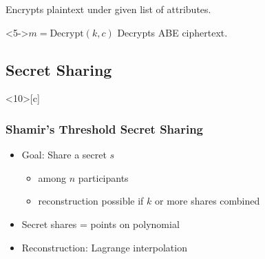 \begin{frame}
\begin{minipage}[t]{0.49\textwidth}
\begin{block}
            \centering
            Encrypts plaintext under given list of attributes.
        \end{block}
        \vspace{0.5cm}
        \begin{block}<5->{\centering $m = \text{Decrypt}(k, c)$}
            \centering
            Decrypts ABE ciphertext.
        \end{block}
    \end{minipage}
\end{frame}

\subsection{Secret Sharing}
\begin{frame}<10>[c]
    \frametitle{Shamir's Threshold Secret Sharing}
    \begin{minipage}{.5\textwidth}
        \begin{itemize}
            \item<1-> Goal: Share a secret $s$
            \begin{itemize}
                \item among $n$ participants
                \item reconstruction possible if $k$ or more shares combined
            \end{itemize}
            \item<2-> Secret shares = points on polynomial
            \item<3-> Reconstruction: Lagrange interpolation
        \end{itemize}
    \end{minipage}
    \begin{minipage}{.48\textwidth}
        
    \end{minipage}
\end{frame}

